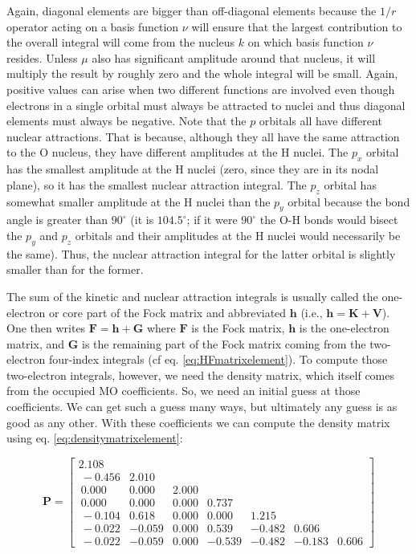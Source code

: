 \documentclass[
  9pt,
]{extbook}
\theoremstyle{definition}
\theoremstyle{definition}
\theoremstyle{definition}
\theoremstyle{remark}
\begin{document}
Again, diagonal elements are bigger than off-diagonal elements because the \(1/r\) operator acting on a basis function \(\nu\) will ensure that the largest contribution to the overall integral will come from the nucleus \(k\) on which basis function \(\nu\) resides. Unless \(\mu\) also has significant amplitude around that nucleus, it will multiply the result by roughly zero and the whole integral will be small. Again, positive values can arise when two different functions are involved even though electrons in a single orbital must always be attracted to nuclei and thus diagonal elements must always be negative. Note that the \(p\) orbitals all have different nuclear attractions. That is because, although they all have the same attraction to the O nucleus, they have different amplitudes at the H nuclei. The \(p_x\) orbital has the smallest amplitude at the H nuclei (zero, since they are in its nodal plane), so it has the smallest nuclear attraction integral. The \(p_z\) orbital has somewhat smaller amplitude at the H nuclei than the \(p_y\) orbital because the bond angle is greater than \(90^\circ\) (it is \(104.5^\circ\); if it were \(90^\circ\) the O-H bonds would bisect the \(p_y\) and \(p_z\) orbitals and their amplitudes at the H nuclei would necessarily be the same). Thus, the nuclear attraction integral for the latter orbital is slightly smaller than for the former.

The sum of the kinetic and nuclear attraction integrals is usually called the one- electron or core part of the Fock matrix and abbreviated \(\mathbf{h}\) (i.e., \(\mathbf{h} = \mathbf{K} + \mathbf{V}\)). One then writes \(\mathbf{F} = \mathbf{h} + \mathbf{G}\) where \(\mathbf{F}\) is the Fock matrix, \(\mathbf{h}\) is the one-electron matrix, and \(\mathbf{G}\) is the remaining part of the Fock matrix coming from the two-electron four-index integrals (cf eq. \eqref{eq:HFmatrixelement}). To compute those two-electron integrals, however, we need the density matrix, which itself comes from the occupied MO coefficients. So, we need an initial guess at those coefficients. We can get such a guess many ways, but ultimately any guess is as good as any other. With these coefficients we can compute the density matrix using eq. \eqref{eq:densitymatrixelement}:

\begin{equation}
\mathbf{P}=
\begin{bmatrix}
2.108 & & & & & & \\\ 
-0.456 & 2.010 & & & & &  \\\
0.000 & 0.000 & 2.000 & & & & \\\
0.000 & 0.000 & 0.000 & 0.737 & & & \\\
-0.104 & 0.618 & 0.000 & 0.000 & 1.215 & & \\\
-0.022 & -0.059 & 0.000 & 0.539 & -0.482 & 0.606 & \\\
-0.022 & -0.059 & 0.000 & -0.539 & -0.482 & -0.183 & 0.606
\end{bmatrix}
\label{eq:pmatrix}
\end{equation}
\end{document}
